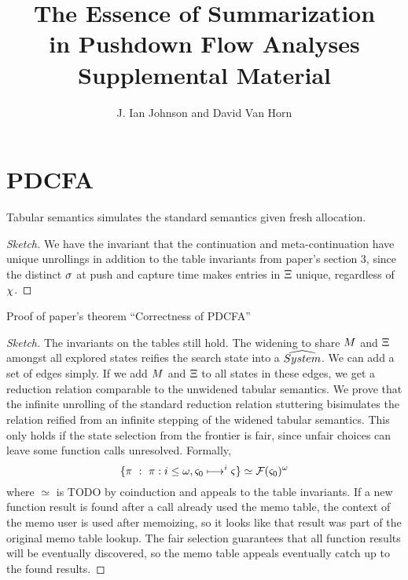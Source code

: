\documentclass[article]{llncs}
\begin{document}
\title{The Essence of Summarization\\ in Pushdown Flow Analyses\\
       \textbf{Supplemental Material}}
\author{J. Ian Johnson and David Van Horn}

\section{PDCFA}


\begin{theorem}\label{thm:concrete-sr}
  Tabular semantics simulates the standard semantics given fresh allocation.
\end{theorem}
\begin{proof}[Sketch]
  We have the invariant that the continuation and meta-continuation have unique unrollings in addition to the table invariants from paper's section 3,
  since the distinct $\sigma$ at push and capture time makes entries in $\Xi$ unique, regardless of $\chi$.
\end{proof}

\noindent{}Proof of paper's theorem ``Correctness of PDCFA''
\begin{proof}[Sketch]
  The invariants on the tables still hold. 
  The widening to share $M$ and $\Xi$ amongst all explored states reifies the search state into a $\widehat{System}$. We can add a set of edges simply.
  If we add $M$ and $\Xi$ to all states in these edges, we get a reduction relation comparable to the unwidened tabular semantics.
  We prove that the infinite unrolling of the standard reduction relation stuttering bisimulates the relation reified from an infinite stepping of the widened tabular semantics.
  This only holds if the state selection from the frontier is fair, since unfair choices can leave some function calls unresolved.
  Formally,
  \begin{equation*}
    \{ \pi\ :\ \pi : i \le \omega, \varsigma_0 \longmapsto^i \varsigma\} \simeq {\mathcal F}(\varsigma_0)^\omega
  \end{equation*}
  where $\simeq$ is TODO
by coinduction and appeals to the table invariants.
  If a new function result is found after a call already used the memo table, the context of the memo user is used after memoizing, so it looks like that result was part of the original memo table lookup.
  The fair selection guarantees that all function results will be eventually discovered, so the memo table appeals eventually catch up to the found results.
\end{proof}
\end{document}
